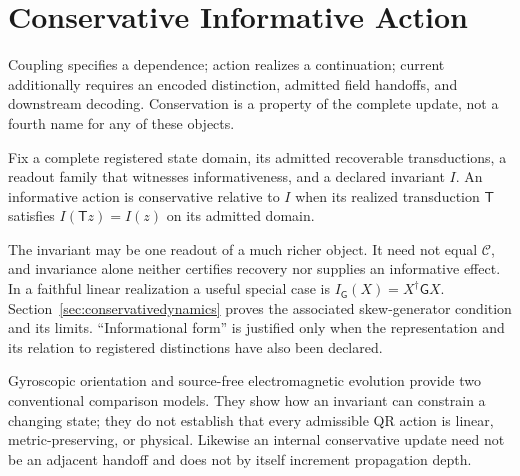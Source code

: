 \begingroup
\renewcommand{\thesection}{6B}
\section{Conservative Informative Action}\label{sec:conservativeaction}
Coupling specifies a dependence; action realizes a continuation; current additionally requires an encoded distinction, admitted field handoffs, and downstream decoding. Conservation is a property of the complete update, not a fourth name for any of these objects.

\begin{definition}\label{def:conservativeaction}
Fix a complete registered state domain, its admitted recoverable transductions, a readout family that witnesses informativeness, and a declared invariant $I$. An informative action is conservative relative to $I$ when its realized transduction $\mathsf T$ satisfies $I(\mathsf Tz)=I(z)$ on its admitted domain.
\end{definition}
The invariant may be one readout of a much richer object. It need not equal $\mathcal C$, and invariance alone neither certifies recovery nor supplies an informative effect. In a faithful linear realization a useful special case is $I_{\mathsf G}(X)=X^\dagger\mathsf G X$. Section~\ref{sec:conservativedynamics} proves the associated skew-generator condition and its limits. ``Informational form'' is justified only when the representation and its relation to registered distinctions have also been declared.

Gyroscopic orientation and source-free electromagnetic evolution provide two conventional comparison models. They show how an invariant can constrain a changing state; they do not establish that every admissible QR action is linear, metric-preserving, or physical. Likewise an internal conservative update need not be an adjacent handoff and does not by itself increment propagation depth.
\endgroup
\setcounter{section}{6}
